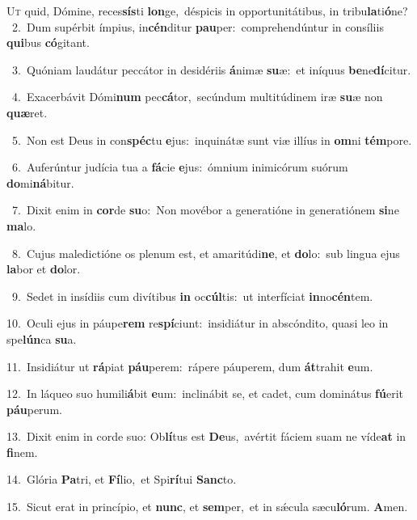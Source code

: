 \lettrine{\initial\textcolor{\initialcolor}{U}}{t} quid, Dómine, reces\-\textbf{sís}\-ti \textbf{lon}\-ge,~\star déspicis in opportunitátibus, in tribu\-\textbf{la}\-ti\-\textbf{ó}\-ne?\\
{\numbfont\textcolor{\numbcolor}{~2.}}~Dum supérbit ímpius, in\-\textbf{cén}\-ditur \textbf{pau}\-per:~\star comprehendúntur in consíliis \textbf{qui}\-bus \textbf{có}\-gitant.\par
{\numbfont\textcolor{\numbcolor}{~3.}}~Quóniam laudátur peccátor in desidériis \textbf{á}\-nimæ \textbf{su}\-æ:~\star et iníquus \textbf{be}\-ne\-\textbf{dí}\-citur.\par
{\numbfont\textcolor{\numbcolor}{~4.}}~Exacerbávit Dómi\textbf{num} pec\-\textbf{cá}\-tor,~\star secúndum multitúdinem iræ \textbf{su}\-æ non \textbf{quæ}\-ret.\par
{\numbfont\textcolor{\numbcolor}{~5.}}~Non est Deus in con\-\textbf{spéc}\-tu \textbf{e}\-jus:~\star inquinátæ sunt viæ illíus in \textbf{om}\-ni \textbf{tém}\-pore.\par
{\numbfont\textcolor{\numbcolor}{~6.}}~Auferúntur judícia tua a \textbf{fá}\-cie \textbf{e}\-jus:~\star ómnium inimicórum suórum \textbf{do}\-mi\-\textbf{ná}\-bitur.\par
{\numbfont\textcolor{\numbcolor}{~7.}}~Dixit enim in \textbf{cor}\-de \textbf{su}\-o:~\star Non movébor a generatióne in generatiónem \textbf{si}\-ne \textbf{ma}\-lo.\par
{\numbfont\textcolor{\numbcolor}{~8.}}~Cujus maledictióne os plenum est, et amaritúdi\-\textbf{ne}\-, et \textbf{do}\-lo:~\star sub lingua ejus \textbf{la}\-bor et \textbf{do}\-lor.\par
{\numbfont\textcolor{\numbcolor}{~9.}}~Sedet in insídiis cum divítibus \textbf{in} oc\-\textbf{cúl}\-tis:~\star ut interfíciat \textbf{in}\-no\-\textbf{cén}\-tem.\par
{\numbfont\textcolor{\numbcolor}{10.}}~Oculi ejus in páupe\textbf{rem} re\-\textbf{spí}\-ciunt:~\star insidiátur in abscóndito, quasi leo in spe\-\textbf{lún}\-ca \textbf{su}\-a.\par
{\numbfont\textcolor{\numbcolor}{11.}}~Insidiátur ut \textbf{rá}\-piat \textbf{páu}\-perem:~\star rápere páuperem, dum \textbf{át}\-trahit \textbf{e}\-um.\par
{\numbfont\textcolor{\numbcolor}{12.}}~In láqueo suo humili\-\textbf{á}\-bit \textbf{e}\-um:~\star inclinábit se, et cadet, cum dominátus \textbf{fú}\-erit \textbf{páu}\-perum.\par
{\numbfont\textcolor{\numbcolor}{13.}}~Dixit enim in corde suo: Ob\-\textbf{lí}\-tus est \textbf{De}\-us,~\star avértit fáciem suam ne víde\textbf{at} in \textbf{fi}\-nem.\par
{\numbfont\textcolor{\numbcolor}{14.}}~Glória \textbf{Pa}\-tri, et \textbf{Fí}\-lio,~\star et Spi\-\textbf{rí}\-tui \textbf{Sanc}\-to.\par
{\numbfont\textcolor{\numbcolor}{15.}}~Sicut erat in princípio, et \textbf{nunc}\-, et \textbf{sem}\-per,~\star et in sǽcula sæcu\-\textbf{ló}\-rum. \textbf{A}\-men.\par

